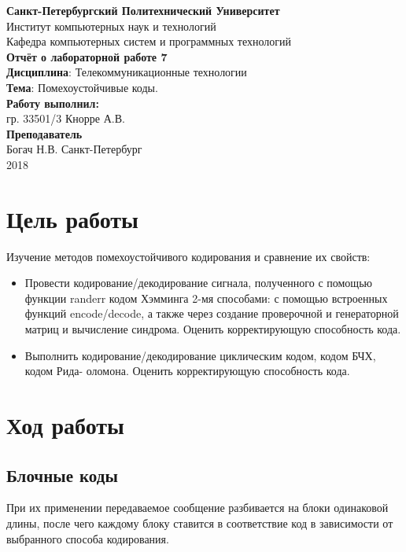 \documentclass[a4paper,14pt]{extarticle}
\begin{document}
\begin{titlepage}
\centering 
{\bfseries Санкт-Петербургский Политехнический Университет} \\
Институт компьютерных наук и технологий \\
Кафедра компьютерных систем и программных технологий \\
\vspace{5cm}
{\centering \textbf{Отчёт о лабораторной работе 7} \\ 
\vspace{0.2cm}
\textbf{Дисциплина}: Телекоммуникационные технологии \\
\vspace{0.2cm}
\textbf{Тема}: Помехоустойчивые коды. } \\
\vspace{4cm}
\hfill {\bfseries Работу выполнил:}  \\
\hfill гр. 33501/3 Кнорре А.В. \\
\hfill {\bfseries Преподаватель}  \\
\hfill Богач Н.В.
\vfill
Санкт-Петербург \\
{\large 2018}
\end{titlepage}

\section{Цель работы}
Изучение методов помехоустойчивого кодирования и сравнение их свойств:
\begin{itemize}
\item Провести кодирование/декодирование сигнала, полученного с помощью функции randerr кодом Хэмминга 2-мя способами: с помощью встроенных функций encode/decode, а также через создание проверочной и генераторной матриц и вычисление синдрома. Оценить корректирующую способность кода. 
\item Выполнить кодирование/декодирование циклическим кодом, кодом БЧХ, кодом Рида- оломона. Оценить корректирующую способность кода.
\end{itemize}

\section{Ход работы}

\subsection{Блочные коды}
При их применении передаваемое сообщение разбивается на блоки одинаковой длины, после чего каждому блоку ставится в соответствие код в зависимости от выбранного способа кодирования.
\end{document}
